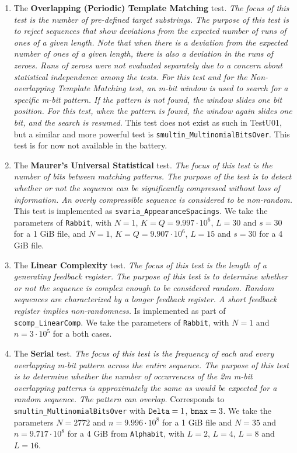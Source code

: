 \begin{enumerate}
\item The {\bf Overlapping (Periodic) Template Matching} test. \textit{The focus
  of this test is the number of pre-defined target substrings. The purpose of
this test is to reject sequences that show deviations from the expected number
of runs of ones of a given length. Note that when there is a deviation from the
expected number of ones of a given length, there is also a deviation in the runs
of zeroes. Runs of zeroes were not evaluated separately due to a concern about
statistical independence among the tests. For this test and for the
Non-overlapping Template Matching test, an m-bit window is used to search for a
specific m-bit pattern. If the pattern is not found, the window slides one bit
position. For this test, when the pattern is found, the window again slides one
bit, and the search is resumed.} This test does not exist as such in TestU01,
but a similar and more powerful test is {\tt smultin\_MultinomialBitsOver}. This
test is for now not available in the battery.

\item The {\bf Maurer's Universal Statistical} test. \textit{The focus of this
  test is the number of bits between matching patterns. The purpose of the test
is to detect whether or not the sequence can be significantly compressed without
loss of information. An overly compressible sequence is considered to be
non-random.} This test is implemented as {\tt svaria\_Appear\-anceSpacings}. We
take the parameters of {\tt Rabbit}, with $N = 1$, $K=Q = 9.997\cdot10^6$, $L =
30$ and $s=30$ for a 1 GiB file, and $N=1$, $K=Q=9.907\cdot10^6$, $L=15$ and
$s=30$ for a 4 GiB file.

\item The {\bf Linear Complexity} test. \textit{The focus of this test is the
  length of a generating feedback register. The purpose of this test is to
determine whether or not the sequence is complex enough to be considered random.
Random sequences are characterized by a longer feedback register. A short
feedback register implies non-randomness.} Is implemented as part of {\tt
scomp\_LinearComp}. We take the parameters of {\tt Rabbit}, with $N = 1$ and
$n=3\cdot10^5$ for a both cases.

\item The {\bf Serial} test. \textit{The focus of this test is the frequency of
  each and every overlapping m-bit pattern across the entire sequence. The
purpose of this test is to determine whether the number of occurrences of the 2m
m-bit overlapping patterns is approximately the same as would be expected for a
random sequence. The pattern can overlap.} Corresponds to {\tt
smultin\_MultinomialBitsOver} with ${\tt Delta} = 1$, ${\tt bmax} = 3$. We take
the parameters $N=2772$ and $n=9.996\cdot10^8$ for a 1 GiB file and $N=35$ and
$n=9.717\cdot10^8$ for a 4 GiB from {\tt Alphabit}, with $L=2$, $L=4$, $L=8$ and $L=16$.


\end{enumerate}
